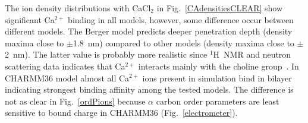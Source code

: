 \documentclass[pre,aps,floatfix,authordate1-4,twocolumn]{revtex4-1}
\begin{document}

The ion density distributions with CaCl$_2$ in Fig.~\ref{CAdensitiesCLEAR} show significant
Ca$^{2+}$ binding in all models, however, some difference occur between different models.
The Berger model predicts deeper penetration depth (density maxima close to $\pm$1.8~nm) compared
to other models (density maxima close to $\pm$2~nm). The latter value is probably more realistic 
since $^1$H~NMR and neutron scattering data indicates that Ca$^{2+}$ interacts mainly with the 
choline group~\cite{hauser76,hauser78,herbette84,cevc90}. In CHARMM36 model almost all Ca$^{2+}$
ions present in simulation bind in bilayer indicating strongest binding affinity among the tested
models. The difference is not as clear in Fig.~\ref{ordPions} because $\alpha$ carbon order parameters 
are least sensitive to bound charge in CHARMM36 (Fig.~\ref{electrometer}).
\end{document}
